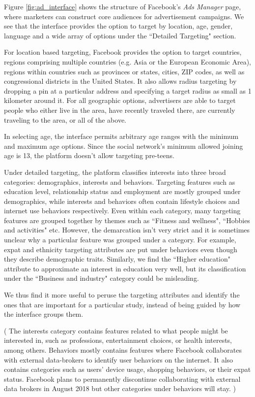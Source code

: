 Figure \ref{fig:ad_interface} shows the structure of Facebook's \textit{Ads Manager} page, where marketers can construct core audiences for advertisement campaigns. We see that the interface provides the option to target by location, age, gender, language and a wide array of options under the ``Detailed Targeting" section.

For location based targeting, Facebook provides the option to target countries, regions comprising multiple countries (e.g. Asia or the European Economic Area), regions within countries such as provinces or states, cities, ZIP codes, as well as congressional districts in the United States. It also allows radius targeting by dropping a pin at a particular address and specifying a target radius as small as 1 kilometer around it. For all geographic options, advertisers are able to target people who either live in the area, have recently traveled there, are currently traveling to the area, or all of the above.

In selecting age, the interface permits arbitrary age ranges with the minimum and maximum age options. Since the social network's minimum allowed joining age is 13, the platform doesn't allow targeting pre-teens.

Under detailed targeting, the platform classifies interests into three broad categories: demographics, interests and behaviors. Targeting features such as education level, relationship status and employment are mostly grouped under demographics, while interests and behaviors often contain lifestyle choices and internet use behaviors respectively. Even within each category, many targeting features are grouped together by themes such as ``Fitness and wellness", ``Hobbies and activities" etc. However, the demarcation isn't very strict and it is sometimes unclear why a particular feature was grouped under a category. For example, expat and ethnicity targeting attributes are put under behaviors even though they describe demographic traits. Similarly, we find the ``Higher education" attribute to approximate an interest in education very well, but its classification under the ``Business and industry" category could be misleading.

We thus find it more useful to peruse the targeting attributes and identify the ones that are important for a particular study, instead of being guided by how the interface groups them.

\if(
The interests category contains features related to what people might be interested in, such as professions, entertainment choices, or health interests, among others. Behaviors mostly contains features where Facebook collaborates with external data-brokers to identify user behaviors on the internet. It also contains categories such as users' device usage, shopping behaviors, or their expat status. Facebook plans to permanently discontinue collaborating with external data brokers in August 2018 but other categories under behaviors will stay.
)\fi

